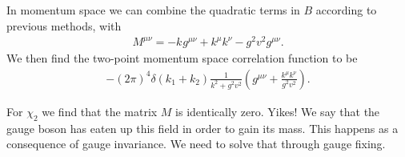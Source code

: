 In momentum space we can combine the quadratic terms in $B$ according to previous methods, with
\begin{align*}
M^{\mu\nu} = -k^{}g^{\mu\nu} + k^{\mu}k^{\nu} - g^{2}v^{2}g^{\mu\nu}.
\end{align*}
We then find the two-point momentum space correlation function to be
\begin{align*}
	-(2\pi)^{4}\delta(k_{1} + k_{2})\frac{1}{k^{2} + g^{2}v^{2}}\left(g^{\mu\nu} + \frac{k^{\mu}k^{\nu}}{g^{2}v^{2}}\right).
\end{align*}

For $\chi_{2}$ we find that the matrix $M$ is identically zero. Yikes! We say that the gauge boson has eaten up this field in order to gain its mass. This happens as a consequence of gauge invariance. We need to solve that through gauge fixing.